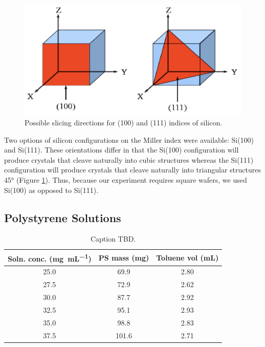 \documentclass[twocolumn]{article}
\begin{document}
            \begin{figure}
                \centering
                \includegraphics[width=0.8\columnwidth]{img/silicon.png}
                \caption{Possible slicing directions for (100) and (111) indices of silicon.}\label{fig:silicon}
            \end{figure}

            Two options of silicon configurations on the Miller index were available: Si(100) and Si(111). These orientations differ in that the Si(100) configuration will produce crystals that cleave naturally into cubic structures whereas the Si(111) configuration will produce crystals that cleave naturally into triangular structures 45° (Figure \ref{fig:silicon}). Thus, because our experiment requires square wafers, we used Si(100) as opposed to Si(111).

            \subsection{Polystyrene Solutions}

                \begin{table}
                    \centering
                    \begin{tabular}{@{}ccc@{}}
                        \toprule
                        Soln. conc. (\unit{\milli\gram\per\milli\liter}) & PS mass (\unit{\milli\gram}) & Toluene vol (\unit{\milli\liter}) \\ \midrule
                        25.0                           & 69.9                  & 2.80                \\
                        27.5                           & 72.9                  & 2.62                \\
                        30.0                           & 87.7                  & 2.92                \\
                        32.5                           & 95.1                  & 2.93                \\
                        35.0                           & 98.8                  & 2.83                \\
                        37.5                           & 101.6                 & 2.71                \\ \bottomrule
                    \end{tabular}
                    \caption{Caption TBD.}\label{tab:soln}
                \end{table}
\end{document}
